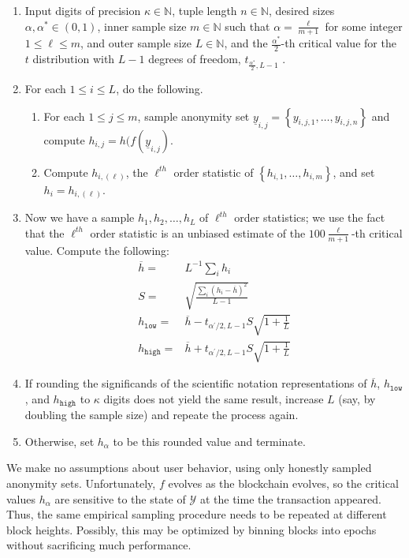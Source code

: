 \documentclass{tran-l}
\theoremstyle{cor}
\theoremstyle{definition}
\theoremstyle{remark}
\theoremstyle{conjecture}
\numberwithin{equation}{section}
\begin{document}
\begin{enumerate}
\item Input digits of precision $\kappa \in \mathbb{N}$, tuple length $n \in \mathbb{N}$, desired sizes $\alpha, \alpha^* \in (0,1)$, inner sample size $m \in \mathbb{N}$ such that $\alpha = \frac{\ell}{m+1}$ for some integer $1 \leq \ell \leq m$, and outer sample size $L \in \mathbb{N}$, and the $\frac{\alpha^*}{2}$-th critical value for the $t$ distribution with $L-1$ degrees of freedom, $t_{\frac{\alpha^*}{2}, L - 1}$ .
\item For each $1 \leq i \leq L$, do the following.
\begin{enumerate}
\item For each $1 \leq j \leq m$, sample anonymity set $\underline{y}_{i, j} = \left\{y_{i, j, 1}, \ldots, y_{i, j, n}\right\}$ and compute $h_{i, j} = h(f(\underline{y}_{i, j})$.
\item Compute $h_{i, (\ell)}$, the $\ell^{th}$ order statistic of $\left\{h_{i, 1}, \ldots, h_{i, m}\right\}$, and set $h_i = h_{i, (\ell)}$.
\end{enumerate}
\item Now we have a sample $h_{1}, h_{2}, \ldots, h_{L}$ of $\ell^{th}$ order statistics; we use the fact that the $\ell^{th}$ order statistic is an unbiased estimate of the $100\frac{\ell}{m+1}$-th critical value. Compute the following:
\begin{align}
\overline{h} =& L^{-1} \sum_i h_i \\
S =& \sqrt{\frac{\sum_i (h_i - \overline{h})^2}{L-1}} \\
h_{\texttt{low}} =& \overline{h} - t_{\alpha^\prime/2, L-1} S \sqrt{1 + \frac{1}{L}} \\
h_{\texttt{high}} =& \overline{h} + t_{\alpha^\prime/2, L-1} S \sqrt{1 + \frac{1}{L}}
\end{align}
\item If rounding the significands of the scientific notation representations of $\overline{h}$, $h_{\texttt{low}}$, and $h_{\texttt{high}}$ to $\kappa$ digits does not yield the same result, increase $L$ (say, by doubling the sample size) and repeate the process again.
\item Otherwise, set $h_{\alpha}$ to be this rounded value and terminate.
\end{enumerate}

We make no assumptions about user behavior, using only honestly sampled anonymity sets.
Unfortunately, $f$ evolves as the blockchain evolves, so the critical values $h_{\alpha}$ are sensitive to the state of $\mathcal{Y}$ at the time the transaction appeared.
Thus, the same empirical sampling procedure needs to be repeated at different block heights.
Possibly, this may be optimized by binning blocks into epochs without sacrificing much performance.
\end{document}
